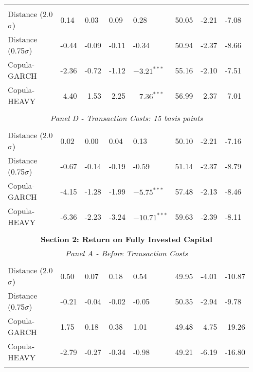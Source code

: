 \documentclass[a4paper,12pt]{report}
\begin{document}
\begin{threeparttable}[H]
\begin{tabularx}{\textwidth}{@{\extracolsep{\fill}}llllllll@{}}
		&       &       &       &       &       &       &  \\
		Distance (2.0$\sigma$) & 0.14  & 0.03  & 0.09  & 0.28  & 50.05 & -2.21  & -7.08 \\
		Distance (0.75$\sigma$) & -0.44 & -0.09 & -0.11 & -0.34 & 50.94 & -2.37  & -8.66 \\
		Copula-GARCH & -2.36 & -0.72 & -1.12 & $-3.21^{***}$ & 55.16 & -2.10  & -7.51 \\
		Copula-HEAVY & -4.40 & -1.53 & -2.25 & $-7.36^{***}$ & 56.99 & -2.37  & -7.01 \\
		\multicolumn{1}{r}{} & \multicolumn{1}{r}{} & \multicolumn{1}{r}{} & \multicolumn{1}{r}{} & \multicolumn{1}{r}{} & \multicolumn{1}{r}{} & \multicolumn{1}{r}{} & \multicolumn{1}{r}{} \\
		\multicolumn{8}{c}{\textit{Panel D - Transaction Costs: 15 basis points}} \\
		&       &       &       &       &       &       &  \\
		Distance (2.0$\sigma$) & 0.02  & 0.00  & 0.04  & 0.13  & 50.10 & -2.21  & -7.16 \\
		Distance (0.75$\sigma$) & -0.67 & -0.14 & -0.19 & -0.59 & 51.14 & -2.37  & -8.79 \\
		Copula-GARCH & -4.15 & -1.28 & -1.99 & $-5.75^{***}$ & 57.48 & -2.13  & -8.46 \\
		Copula-HEAVY & -6.36 & -2.23 & -3.24 & $-10.71^{***}$ & 59.63 & -2.39  & -8.11 \\
		\multicolumn{1}{r}{} & \multicolumn{1}{r}{} & \multicolumn{1}{r}{} & \multicolumn{1}{r}{} & \multicolumn{1}{r}{} & \multicolumn{1}{r}{} & \multicolumn{1}{r}{} & \multicolumn{1}{r}{} \\
		\midrule
		\multicolumn{8}{c}{\textbf{Section 2: Return on Fully Invested Capital}} \\
		\multicolumn{8}{c}{\textit{Panel A - Before Transaction Costs}} \\
		&       &       &       &       &       &       &  \\
		Distance (2.0$\sigma$) & 0.50  & 0.07  & 0.18  & 0.54  & 49.95 & -4.01  & -10.87 \\
		Distance (0.75$\sigma$) & -0.21 & -0.04 & -0.02 & -0.05 & 50.35 &  -2.94  & -9.78 \\
		Copula-GARCH & 1.75  & 0.18  & 0.38  & 1.01  & 49.48 & -4.75  & -19.26 \\
		Copula-HEAVY & -2.79 & -0.27 & -0.34 & -0.98 & 49.21 & -6.19  & -16.80 \\
		\multicolumn{1}{r}{} & \multicolumn{1}{r}{} & \multicolumn{1}{r}{} & \multicolumn{1}{r}{} & \multicolumn{1}{r}{} & \multicolumn{1}{r}{} & \multicolumn{1}{r}{} & \multicolumn{1}{r}{} \\

\end{tabularx}
\end{threeparttable}
\end{document}
